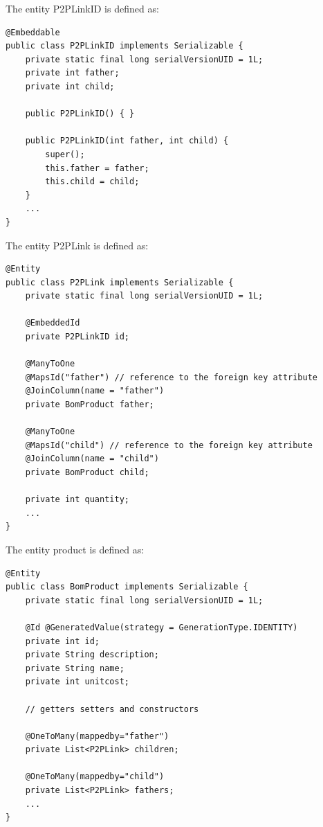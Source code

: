The entity P2PLinkID is defined as:  
\begin{lstlisting}[style=Java]
@Embeddable
public class P2PLinkID implements Serializable {
    private static final long serialVersionUID = 1L;
    private int father;
    private int child;

    public P2PLinkID() { }

    public P2PLinkID(int father, int child) {
        super();
        this.father = father;
        this.child = child;
    }
    ...
}
\end{lstlisting}
The entity P2PLink is defined as:  
\begin{lstlisting}[style=Java]
@Entity
public class P2PLink implements Serializable {
    private static final long serialVersionUID = 1L;

    @EmbeddedId
    private P2PLinkID id;

    @ManyToOne
    @MapsId("father") // reference to the foreign key attribute
    @JoinColumn(name = "father")
    private BomProduct father;

    @ManyToOne
    @MapsId("child") // reference to the foreign key attribute
    @JoinColumn(name = "child")
    private BomProduct child;

    private int quantity;
    ...
}
\end{lstlisting}
The entity product is defined as:  
\begin{lstlisting}[style=Java]
@Entity
public class BomProduct implements Serializable {
    private static final long serialVersionUID = 1L;

    @Id @GeneratedValue(strategy = GenerationType.IDENTITY)
    private int id;
    private String description;
    private String name;
    private int unitcost;

    // getters setters and constructors

    @OneToMany(mappedby="father")
    private List<P2PLink> children;

    @OneToMany(mappedby="child")
    private List<P2PLink> fathers;
    ...
}
\end{lstlisting}